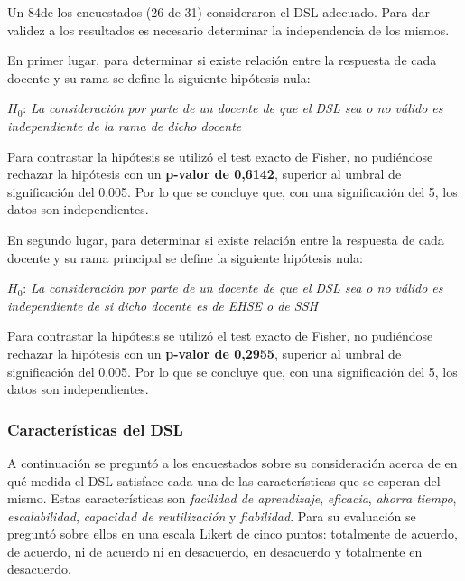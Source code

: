 Un 84\percentage{ }de los encuestados (26 de 31) consideraron el DSL adecuado. Para dar validez a los resultados es necesario determinar la independencia de los mismos.

En primer lugar, para determinar si existe relación entre la respuesta de cada docente y su rama se define la siguiente hipótesis nula:

\medskip
\begin{mdframed}[style=hipotesis0]
$H_0$: \emph{La consideración por parte de un docente de que el DSL sea o no válido es independiente de la rama de dicho docente}
\end{mdframed}

\medskip
Para contrastar la hipótesis se utilizó el test exacto de Fisher, no pudiéndose rechazar la hipótesis con un \textbf{p-valor de 0,6142}, superior al umbral de significación del 0,005. Por lo que se concluye que, con una significación del 5\percentage, los datos son independientes.

En segundo lugar, para determinar si existe relación entre la respuesta de cada docente y su rama principal se define la siguiente hipótesis nula:

\medskip
\begin{mdframed}[style=hipotesis0]
$H_0$: \emph{La consideración por parte de un docente de que el DSL sea o no válido es independiente de si  dicho docente es de EHSE o de SSH}
\end{mdframed}

\medskip
Para contrastar la hipótesis se utilizó el test exacto de Fisher, no pudiéndose rechazar la hipótesis con un \textbf{p-valor de 0,2955}, superior al umbral de significación del 0,005. Por lo que se concluye que, con una significación del 5\percentage, los datos son independientes.

\subsubsection{Características del DSL}

A continuación se preguntó a los encuestados sobre su consideración acerca de en qué medida el DSL satisface cada una de las características que se esperan del mismo. Estas características son \emph{facilidad de aprendizaje}, \emph{eficacia}, \emph{ahorra tiempo}, \emph{escalabilidad}, \emph{capacidad de reutilización} y \emph{fiabilidad}. Para su evaluación se preguntó sobre ellos en una escala Likert de cinco puntos: totalmente de acuerdo, de acuerdo, ni de acuerdo ni en desacuerdo, en desacuerdo y totalmente en desacuerdo. 

